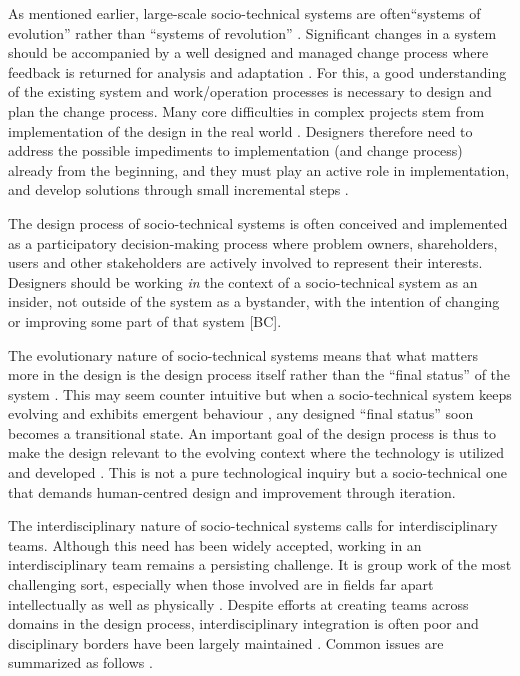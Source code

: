 As mentioned earlier, large-scale socio-technical systems are often``systems of evolution'' rather than ``systems of revolution'' \cite{Baxter2011,Norman2015}. Significant changes in a system should be accompanied by a well designed and managed change process where feedback is returned for analysis and adaptation \cite{Baxter2011}. For this, a good understanding of the existing system and work/operation processes is necessary to design and plan the change process. Many core difficulties in complex projects stem from implementation of the design in the real world \cite{Norman2015}. Designers therefore need to address the possible impediments to implementation (and change process) already from the beginning, and they must play an active role in implementation, and develop solutions through small incremental steps \cite{Norman2015}.

 The design process of socio-technical systems is often conceived and implemented as a participatory decision-making process where problem owners, shareholders, users and other stakeholders are actively involved to represent their interests. 
Designers should be working \textit{in} the context of a socio-technical system as an insider, not outside of the system as a bystander, with the intention of changing or improving some part of that system [BC]. 

The evolutionary nature of socio-technical systems means that what matters more in the design is the design process itself rather than the ``final status'' of the system \cite{Shin2014}. This may seem counter intuitive but when a socio-technical system keeps evolving and exhibits emergent behaviour \cite{Nikolic2009}, any designed ``final status'' soon becomes a transitional state. An important goal of the design process is thus to make the design relevant to the evolving context where the technology is utilized and developed \cite{Shin2014}. This is not a pure technological inquiry but a socio-technical one that demands human-centred design and improvement through iteration. 

The interdisciplinary nature of socio-technical systems calls for interdisciplinary teams. Although this need has been widely accepted, working in an interdisciplinary team remains a persisting challenge. 
It is group work of the most challenging sort, especially when those involved are in fields far apart intellectually as well as physically \cite{Brewer1999}. 
Despite efforts at creating teams across domains in the design process, interdisciplinary integration is often poor and disciplinary borders have been largely maintained \cite{Baxter2011}. Common issues are summarized as follows \cite{Baxter2011,Brewer1999}.

